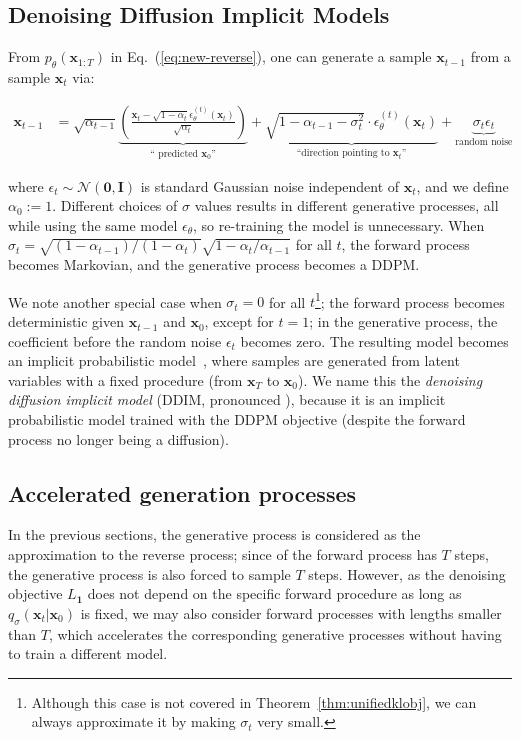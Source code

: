\subsection{Denoising Diffusion Implicit Models}
\label{sec:reverse-family}
From $p_\theta({\bm{x}}_{1:T})$ in Eq.~(\ref{eq:new-reverse}), one can generate a sample ${\bm{x}}_{t-1}$ from a sample ${\bm{x}}_{t}$ via:

\begin{align}
    {\bm{x}}_{t-1} & = \sqrt{\alpha_{t-1}} \underbrace{\left(\frac{{\bm{x}}_t - \sqrt{1 - \alpha_t} \epsilon_\theta^{(t)}({\bm{x}}_t)}{\sqrt{\alpha_t}}\right)}_{\text{`` predicted } {\bm{x}}_0 \text{''}} + \underbrace{\sqrt{1 - \alpha_{t-1} - \sigma_t^2} \cdot \epsilon_\theta^{(t)}({\bm{x}}_t)}_{\text{``direction pointing to } {\bm{x}}_t \text{''}} + \underbrace{\sigma_t \epsilon_t}_{\text{random noise}} \label{eq:sample-eq-gen}
\end{align}

where $\epsilon_t \sim {\mathcal{N}}({\bm{0}}, {\bm{I}})$ is standard Gaussian noise independent of ${\bm{x}}_t$, and we define $\alpha_0 := 1$. Different choices of $\sigma$ values results in different generative processes, all while using the same model $\epsilon_\theta$, so re-training the model is unnecessary. When $\sigma_t = \sqrt{(1 - \alpha_{t-1}) / (1 - \alpha_t)} \sqrt{1 - \alpha_t / \alpha_{t-1}}$ for all $t$, the forward process becomes Markovian, and the generative process becomes a DDPM.

We note another special case when $\sigma_t = 0$ for all $t$\footnote{Although this case is not covered in Theorem~\ref{thm:unifiedklobj}, we can always approximate it by making $\sigma_t$ very small.}; the forward process becomes deterministic given ${\bm{x}}_{t-1}$ and ${\bm{x}}_0$, except for $t = 1$; in the generative process, the coefficient before the random noise $\epsilon_t$ becomes zero. The resulting model becomes an implicit probabilistic model~\citep{mohamed2016learning}, where samples are generated from latent variables with a fixed procedure (from ${\bm{x}}_T$ to ${\bm{x}}_0$). We name this the \textit{denoising diffusion implicit model} (DDIM, pronounced ), because it is an implicit probabilistic model trained with the DDPM objective (despite the forward process no longer being a diffusion). 

\subsection{Accelerated generation processes}
\label{sec:acceleration}
In the previous sections, the generative process is considered as the approximation to the reverse process; since of the forward process has $T$ steps, the generative process is also forced to sample $T$ steps. However, as the denoising objective $L_{\bm{1}}$ does not depend on the specific forward procedure as long as $q_\sigma({\bm{x}}_{t} | {\bm{x}}_0)$ is fixed, we may also consider forward processes with lengths smaller than $T$, which accelerates the corresponding generative processes without having to train a different model.

